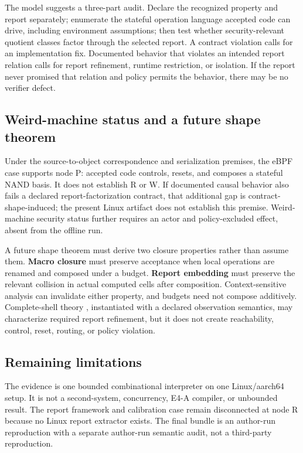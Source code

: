 \documentclass[conference]{IEEEtran}
\begin{document}
The model suggests a three-part audit. Declare the recognized property and report separately; enumerate the stateful operation language accepted code can drive, including environment assumptions; then test whether security-relevant quotient classes factor through the selected report. A contract violation calls for an implementation fix. Documented behavior that violates an intended report relation calls for report refinement, runtime restriction, or isolation. If the report never promised that relation and policy permits the behavior, there may be no verifier defect.

\subsection{Weird-machine status and a future shape theorem}

Under the source-to-object correspondence and serialization premises, the eBPF case supports node P: accepted code controls, resets, and composes a stateful NAND basis. It does not establish R or W. If documented causal behavior also fails a declared report-factorization contract, that additional gap is contract-shape-induced; the present Linux artifact does not establish this premise. Weird-machine security status further requires an actor and policy-excluded effect, absent from the offline run.

A future shape theorem must derive two closure properties rather than assume them. \textbf{Macro closure} must preserve acceptance when local operations are renamed and composed under a budget. \textbf{Report embedding} must preserve the relevant collision in actual computed cells after composition. Context-sensitive analysis can invalidate either property, and budgets need not compose additively. Complete-shell theory \cite{ref17}, instantiated with a declared observation semantics, may characterize required report refinement, but it does not create reachability, control, reset, routing, or policy violation.

\subsection{Remaining limitations}

The evidence is one bounded combinational interpreter on one Linux/aarch64 setup. It is not a second-system, concurrency, E4-A compiler, or unbounded result. The report framework and calibration case remain disconnected at node R because no Linux report extractor exists. The final bundle is an author-run reproduction with a separate author-run semantic audit, not a third-party reproduction.
\end{document}
